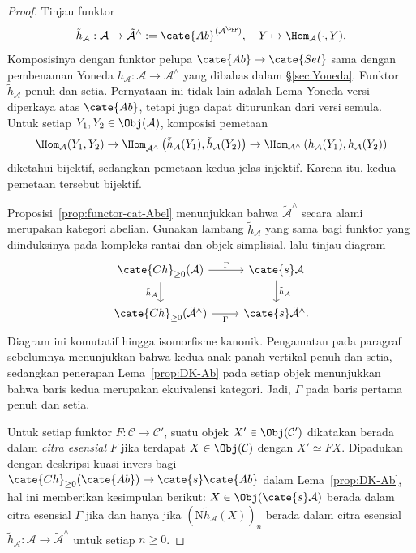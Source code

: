 \begin{proof}
	Tinjau funktor
	\[ \tilde{h}_{\mathcal{A}}: \mathcal{A} \to \tilde{\mathcal{A}}^\wedge := \cate{Ab}^{(\mathcal{A}^{\opp})}, \quad Y \mapsto \Hom_{\mathcal{A}}(\cdot, Y). \]
	Komposisinya dengan funktor pelupa $\cate{Ab}\to\cate{Set}$ sama dengan
	pembenaman Yoneda
	$h_{\mathcal{A}}:\mathcal{A}\to\mathcal{A}^\wedge$ yang dibahas
	dalam \S\ref{sec:Yoneda}. Funktor $\tilde{h}_{\mathcal{A}}$ penuh dan setia.
	Pernyataan ini tidak lain adalah Lema Yoneda versi diperkaya atas $\cate{Ab}$,
	tetapi juga dapat diturunkan dari versi semula. Untuk setiap
	$Y_1,Y_2\in\Obj(\mathcal{A})$, komposisi pemetaan
	\[ \Hom_{\mathcal{A}}(Y_1, Y_2) \to \Hom_{\tilde{\mathcal{A}}^\wedge}\left(\tilde{h}_{\mathcal{A}}(Y_1), \tilde{h}_{\mathcal{A}}(Y_2) \right) \to \Hom_{\mathcal{A}^\wedge}\left( h_{\mathcal{A}}(Y_1), h_{\mathcal{A}}(Y_2)\right) \]
	diketahui bijektif, sedangkan pemetaan kedua jelas injektif. Karena itu,
	kedua pemetaan tersebut bijektif.

	Proposisi~\ref{prop:functor-cat-Abel} menunjukkan bahwa
	$\tilde{\mathcal{A}}^\wedge$ secara alami merupakan kategori abelian. Gunakan
	lambang $\tilde{h}_{\mathcal{A}}$ yang sama bagi funktor yang diinduksinya
	pada kompleks rantai dan objek simplisial, lalu tinjau diagram
	\begin{equation*}\begin{tikzcd}
		\cate{Ch}_{\geq 0}(\mathcal{A}) \arrow[d, "{\tilde{h}_{\mathcal{A}}}"'] \arrow[r, "\Gamma"] & \cate{s}\mathcal{A} \arrow[d, "{\tilde{h}_{\mathcal{A}}}"] \\
		\cate{Ch}_{\geq 0}(\tilde{\mathcal{A}}^\wedge) \arrow[r, "\Gamma"'] & \cate{s}\tilde{\mathcal{A}}^\wedge.
	\end{tikzcd}\end{equation*}
	Diagram ini komutatif hingga isomorfisme kanonik. Pengamatan pada paragraf
	sebelumnya menunjukkan bahwa kedua anak panah vertikal penuh dan setia,
	sedangkan penerapan Lema~\ref{prop:DK-Ab} pada setiap objek menunjukkan
	bahwa baris kedua merupakan ekuivalensi kategori. Jadi, $\Gamma$ pada baris
	pertama penuh dan setia.

	Untuk setiap funktor $F:\mathcal{C}\to\mathcal{C}'$, suatu objek
	$X'\in\Obj(\mathcal{C}')$ dikatakan berada dalam \emph{citra esensial} $F$
	jika terdapat $X\in\Obj(\mathcal{C})$ dengan $X'\simeq FX$. Dipadukan
	dengan deskripsi kuasi-invers bagi
	$\cate{Ch}_{\geq0}(\cate{Ab})\to\cate{s}\cate{Ab}$ dalam
	Lema~\ref{prop:DK-Ab}, hal ini memberikan kesimpulan berikut:
	$X\in\Obj(\cate{s}\mathcal{A})$ berada dalam citra esensial $\Gamma$ jika
	dan hanya jika $(\mathrm{N}\tilde{h}_{\mathcal{A}}(X))_n$ berada dalam citra
	esensial $\tilde{h}_{\mathcal{A}}:\mathcal{A}\to
	\tilde{\mathcal{A}}^\wedge$ untuk setiap $n\geq0$.


\end{proof}
